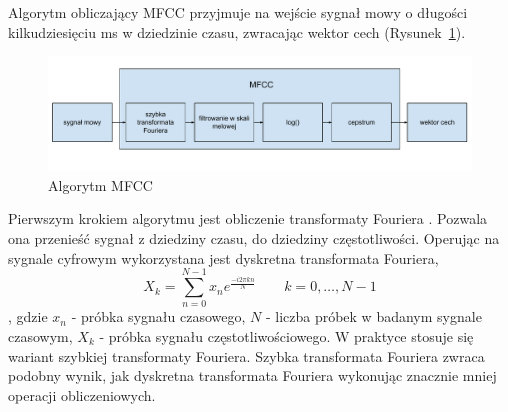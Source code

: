 \documentclass[a4paper,12pt,twoside,openany]{report}
\newcommand{\Rys}[1]{(Rysunek~\ref{#1})}
\begin{document}
Algorytm obliczający MFCC przyjmuje na wejście sygnał mowy o długości kilkudziesięciu ms w dziedzinie czasu,
zwracając wektor cech \Rys{rys:mgcc:schemat}.
\begin{figure}[h]
	\centering
	\includegraphics[width=\textwidth]{mfcc-schemat}
	\caption{Algorytm MFCC}
	\label{rys:mgcc:schemat}
\end{figure}

Pierwszym krokiem algorytmu jest obliczenie transformaty Fouriera \cite{Steidl2009}. 
Pozwala ona przenieść sygnał z dziedziny czasu, do dziedziny częstotliwości. 
Operując na sygnale cyfrowym wykorzystana jest dyskretna transformata Fouriera,
\begin{equation}
	X_{k}=\sum _{n=0}^{N-1}x_{n}e^{\frac{-i2\pi kn}{N}}\qquad k=0,\dots ,N-1
\end{equation}, gdzie 
$x_n$ - próbka sygnału czasowego, 
$N$ - liczba próbek w badanym sygnale czasowym,
$X_k$ - próbka sygnału częstotliwościowego.
W praktyce stosuje się wariant szybkiej transformaty Fouriera. 
Szybka transformata Fouriera zwraca podobny wynik, jak dyskretna transformata Fouriera
wykonując znacznie mniej operacji obliczeniowych.
\end{document}
